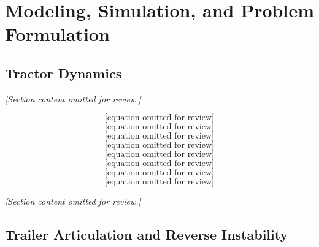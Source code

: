 \chapter{Modeling, Simulation, and Problem Formulation}
\label{ch:modeling_simulation_problem}
\label{ch:modeling}

\section{Tractor Dynamics}
\label{sec:tractor_dynamics}

\textit{[Section content omitted for review.]}

\begin{equation}
\text{[equation omitted for review]}
\label{eq:tractor_x}
\end{equation}
\begin{equation}
\text{[equation omitted for review]}
\label{eq:tractor_y}
\end{equation}
\begin{equation}
\text{[equation omitted for review]}
\label{eq:slip}
\end{equation}
\begin{equation}
\text{[equation omitted for review]}
\label{eq:tireforce}
\end{equation}
\begin{equation}
\text{[equation omitted for review]}
\label{eq:long}
\end{equation}
\begin{equation}
\text{[equation omitted for review]}
\label{eq:lat}
\end{equation}
\begin{equation}
\text{[equation omitted for review]}
\label{eq:yaw}
\end{equation}
\begin{equation}
\text{[equation omitted for review]}
\label{eq:tractor_ss}
\end{equation}

\textit{[Section content omitted for review.]}

\section{Trailer Articulation and Reverse Instability}

